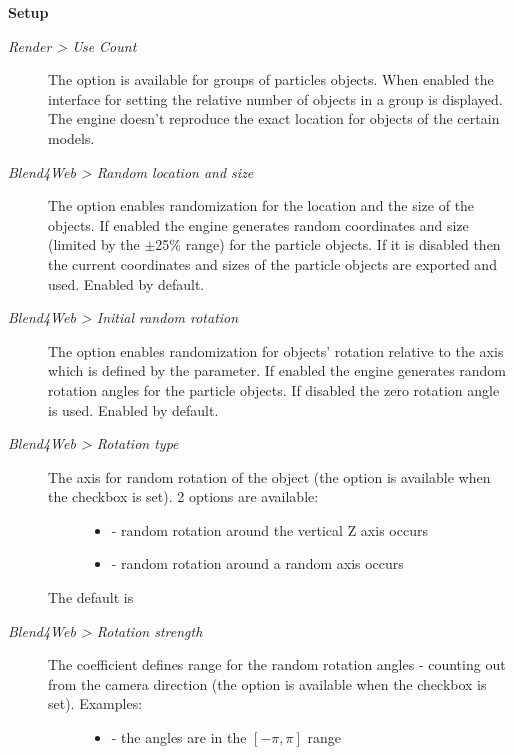 \documentclass[a4paper,12pt,oneside]{sphinxmanual}
\begin{document}
\textbf{Setup}
\begin{description}
\item[{\emph{Render \textgreater{} Use Count}}] \leavevmode
The option is available for groups of particles objects. When enabled the interface for setting the relative number of objects in a group is displayed. The engine doesn't reproduce the exact location for objects of the certain models.

\item[{\emph{Blend4Web \textgreater{} Random location and size}}] \leavevmode
The option enables randomization for the location and the size of the objects. If enabled the engine generates random coordinates and size (limited by the \(\pm\)25\% range) for the particle objects. If it is disabled then the current coordinates and sizes of the particle objects are exported and used. Enabled by default.

\item[{\emph{Blend4Web \textgreater{} Initial random rotation}}] \leavevmode
The option enables randomization for objects' rotation relative to the axis which is defined by the  parameter. If enabled the engine generates random rotation angles for the particle objects. If disabled the zero rotation angle is used. Enabled by default.

\item[{\emph{Blend4Web \textgreater{} Rotation type}}] \leavevmode\begin{description}
\item[{The axis for random rotation of the object (the option is available when the  checkbox is set). 2 options are available:}] \leavevmode\begin{itemize}
\item {} 
 - random rotation around the vertical Z axis occurs

\item {} 
 - random rotation around a random axis occurs

\end{itemize}

\end{description}

The default is 

\item[{\emph{Blend4Web \textgreater{} Rotation strength}}] \leavevmode\begin{description}
\item[{The coefficient defines range for the random rotation angles - counting out from the camera direction (the option is available when the  checkbox is set). Examples:}] \leavevmode\begin{itemize}
\item {} 
 - the angles are in the \([-\pi, \pi]\) range


\end{itemize}
\end{description}
\end{description}
\end{document}
